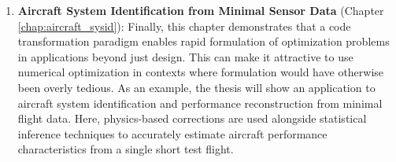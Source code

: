 \begin{enumerate}
    \item \textbf{Aircraft System Identification from Minimal Sensor Data} (Chapter \ref{chap:aircraft_sysid}): Finally, this chapter demonstrates that a code transformation paradigm enables rapid formulation of optimization problems in applications beyond just design. This can make it attractive to use numerical optimization in contexts where formulation would have otherwise been overly tedious. As an example, the thesis will show an application to aircraft system identification and performance reconstruction from minimal flight data. Here, physics-based corrections are used alongside statistical inference techniques to accurately estimate aircraft performance characteristics from a single short test flight.
\end{enumerate}

